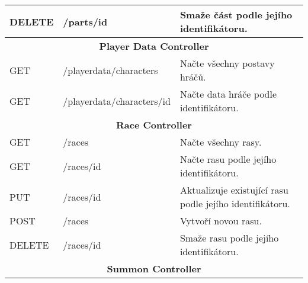 \begin{longtable}{|l|l|p{}|}
    DELETE          & /parts/{id}                            & Smaže část podle jejího identifikátoru.                                                                                                    \\
    \hline
    \multicolumn{3}{|c|}{\textbf{Player Data Controller}}                                                                                                                                                 \\
    \hline
    GET             & /playerdata/characters                 & Načte všechny postavy hráčů.                                                                                                               \\
    GET             & /playerdata/characters/{id}            & Načte data hráče podle identifikátoru.                                                                                                     \\
    \hline
    \multicolumn{3}{|c|}{\textbf{Race Controller}}                                                                                                                                                        \\
    \hline
    GET             & /races                                 & Načte všechny rasy.                                                                                                                        \\
    GET             & /races/{id}                            & Načte rasu podle jejího identifikátoru.                                                                                                    \\
    PUT             & /races/{id}                            & Aktualizuje existující rasu podle jejího identifikátoru.                                                                                   \\
    POST            & /races                                 & Vytvoří novou rasu.                                                                                                                        \\
    DELETE          & /races/{id}                            & Smaže rasu podle jejího identifikátoru.                                                                                                    \\
    \hline
    \multicolumn{3}{|c|}{\textbf{Summon Controller}}                                                                                                                                                      \\

\end{longtable}
